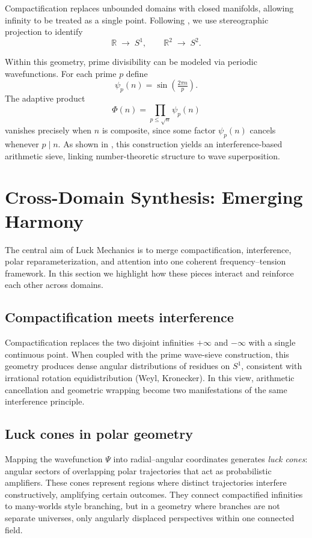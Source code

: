 \documentclass[12pt]{article}
\theoremstyle{plain}
\theoremstyle{definition}
\begin{document}
Compactification replaces unbounded domains with closed manifolds, allowing 
infinity to be treated as a single point. Following \citet{valvo2024limits}, 
we use stereographic projection to identify
\[
\mathbb{R} \;\to\; S^1,
\qquad
\mathbb{R}^2 \;\to\; S^2.
\]

Within this geometry, prime divisibility can be modeled via periodic 
wavefunctions. For each prime $p$ define
\[
\psi_p(n) = \sin\!\left(\tfrac{2\pi n}{p}\right).
\]
The adaptive product
\[
\Phi(n) = \prod_{p \le \sqrt{n}} \psi_p(n)
\]
vanishes precisely when $n$ is composite, since some factor $\psi_p(n)$ 
cancels whenever $p \mid n$.  
As shown in \citet{ashiru2024wave}, this construction yields an 
interference-based arithmetic sieve, linking number-theoretic structure to 
wave superposition.
\section{Cross-Domain Synthesis: Emerging Harmony}

The central aim of Luck Mechanics is to merge compactification, interference, 
polar reparameterization, and attention into one coherent frequency–tension 
framework. In this section we highlight how these pieces interact and reinforce 
each other across domains.

\subsection{Compactification meets interference}

Compactification replaces the two disjoint infinities $+\infty$ and $-\infty$ 
with a single continuous point. When coupled with the prime wave-sieve 
construction, this geometry produces dense angular distributions of residues 
on $S^1$, consistent with irrational rotation equidistribution 
(Weyl, Kronecker). In this view, arithmetic cancellation and geometric wrapping 
become two manifestations of the same interference principle.

\subsection{Luck cones in polar geometry}

Mapping the wavefunction $\Psi$ into radial–angular coordinates generates 
\emph{luck cones}: angular sectors of overlapping polar trajectories that act 
as probabilistic amplifiers. These cones represent regions where distinct 
trajectories interfere constructively, amplifying certain outcomes. They 
connect compactified infinities to many-worlds style branching, but in a 
geometry where branches are not separate universes, only angularly displaced 
perspectives within one connected field.
\end{document}
